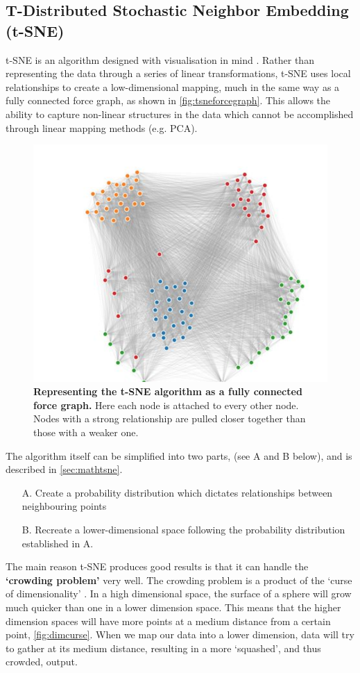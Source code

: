 \subsection{T-Distributed Stochastic Neighbor Embedding (t-SNE)}\label{sec:overcrowd}

t-SNE is an algorithm designed with visualisation in mind \citep{tsne}. Rather than representing the data through a series of linear transformations, t-SNE uses local relationships to create a low-dimensional mapping, much in the same way as a fully connected force graph, as shown in \autoref{fig:tsneforcegraph}. This allows the ability to capture non-linear structures in the data which cannot be accomplished through linear mapping methods (e.g. PCA).

\begin{figure}[H]
    \centering
    \includegraphics[width=.6\textwidth]{./4fig/tsneforcegraph.png}
    \caption{\textbf{Representing the t-SNE algorithm as a fully connected force graph.} Here each node is attached to every other node. Nodes with a strong relationship are pulled closer together than those with a weaker one.}
    \label{fig:tsneforcegraph}
\end{figure}



The algorithm itself can be simplified into two parts, (see A and B below), and is described in \autoref{sec:mathtsne}.

\begin{itemize}
  \item [A.] Create a probability distribution which dictates relationships between neighbouring points
  \item [B.] Recreate a lower-dimensional space following the probability distribution established in A.
\end{itemize}

The main reason t-SNE produces good results is that it can handle the \textbf{`crowding problem'} very well. The crowding problem is a product of the `curse of dimensionality' \citep{curse}. In a high dimensional space, the surface of a sphere will grow much quicker than one in a lower dimension space. This means that the higher dimension spaces will have more points at a medium distance from a certain point, \autoref{fig:dimcurse}. When we map our data into a lower dimension, data will try to gather at its medium distance, resulting in a more `squashed', and thus crowded, output.



